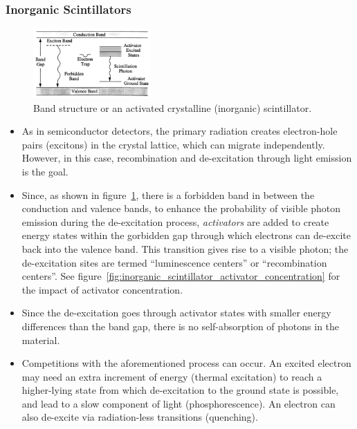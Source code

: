 \subsubsection{Inorganic Scintillators}
\begin{figure}[ht]
    \centering
    \includegraphics[width=0.4\textwidth]{images/inorganic_scintillator_band_structure.png}
    \caption{Band structure or an activated crystalline (inorganic) scintillator.}
    \label{fig:inorganic_scintillator_band_structure}
\end{figure}
\begin{itemize}
    \item As in semiconductor detectors, the primary radiation creates electron-hole pairs (excitons) in the crystal lattice, which can migrate independently. However, in this case, recombination and de-excitation through light emission is the goal.
    \item Since, as shown in figure~\ref{fig:inorganic_scintillator_band_structure}, there is a forbidden band in between the conduction and valence bands, to enhance the probability of visible photon emission during the de-excitation process, \emph{activators} are added to create energy states within the gorbidden gap through which electrons can de-excite back into the valence band. This transition gives rise to a visible photon; the de-excitation sites are termed ``luminescence centers'' or ``recombination centers''. See figure~\ref{fig:inorganic_scintillator_activator_concentration} for the impact of activator concentration. 
    \item Since the de-excitation goes through activator states with smaller energy differences than the band gap, there is no self-absorption of photons in the material. 
    \item Competitions with the aforementioned process can occur. An excited electron may need an extra increment of energy (thermal excitation) to reach a higher-lying state from which de-excitation to the ground state is possible, and lead to a slow component of light (phosphorescence). An electron can also de-excite via radiation-less transitions (quenching). 
\end{itemize}
